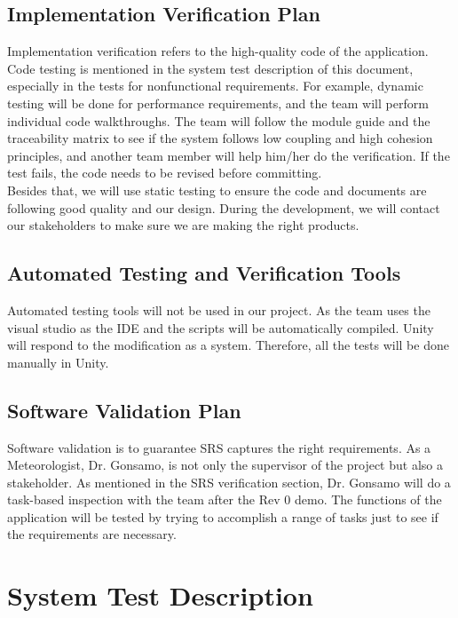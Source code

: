 \documentclass[12pt, titlepage]{article}
\begin{document}
\subsection{Implementation Verification Plan}
Implementation verification refers to the high-quality code of the 
application. Code testing is mentioned in the system test 
description of this document, especially in the tests for
nonfunctional requirements. For example, dynamic testing will be done
for performance requirements, and the team will perform individual code
walkthroughs. The team will follow the module guide and the traceability matrix to see
if the system follows low coupling and high cohesion principles, and another team member will help him/her do the
verification.
If the test fails, the code needs to be revised
before committing.\\
\noindent
Besides that, we will use static testing to ensure the code and documents are following good quality and our design. During the development, we will contact our stakeholders to make sure we are making the right products.

\subsection{Automated Testing and Verification Tools}

Automated testing tools will not be used in our project. As the team uses the visual studio as the IDE and the scripts will be automatically compiled. Unity will respond to the modification as a system. Therefore, all the tests will be done manually in Unity.

\subsection{Software Validation Plan}
Software validation is to guarantee SRS captures the right requirements.  As a
Meteorologist, Dr. Gonsamo, is not only the supervisor of the project but also a
stakeholder. As mentioned in the SRS verification section, Dr. Gonsamo will do a task-based inspection with the team after the Rev 0 demo. The functions of the application will be tested by trying to accomplish a range of tasks just to see if the requirements are necessary.

\newpage

\section{System Test Description}
\end{document}
